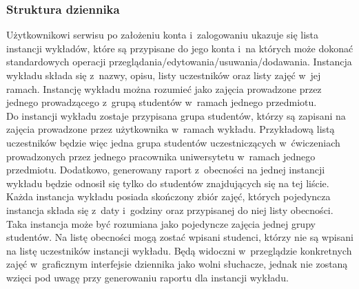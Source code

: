 \documentclass[declaration,shortabstract, mgr]{iithesis}
\begin{document}
\subsubsection{Struktura dziennika}
\indent Użytkownikowi serwisu po założeniu konta i~zalogowaniu ukazuje się lista instancji wykładów, które są przypisane do jego konta i~na których może dokonać standardowych operacji przeglądania/edytowania/usuwania/dodawania. Instancja wykładu składa się z~nazwy, opisu, listy uczestników oraz listy zajęć w~jej ramach. Instancję wykładu można rozumieć jako zajęcia prowadzone przez jednego prowadzącego z~grupą studentów w~ramach jednego przedmiotu. \\
\indent Do instancji wykładu zostaje przypisana grupa studentów, którzy są zapisani na zajęcia prowadzone przez użytkownika w~ramach wykładu. Przykładową listą uczestników będzie więc jedna grupa studentów uczestniczących w~ćwiczeniach prowadzonych przez jednego pracownika uniwersytetu w~ramach jednego przedmiotu. Dodatkowo, generowany raport z~obecności na jednej instancji wykładu będzie odnosił się tylko do studentów znajdujących się na tej liście.\\
\indent Każda instancja wykładu posiada skończony zbiór zajęć, których pojedyncza instancja składa się z~daty i~godziny oraz przypisanej do niej listy obecności. Taka instancja może być rozumiana jako pojedyncze zajęcia jednej grupy studentów. Na listę obecności mogą zostać wpisani studenci, którzy nie są wpisani na listę uczestników instancji wykładu. Będą widoczni w~przeglądzie konkretnych zajęć w~graficznym interfejsie dziennika jako wolni słuchacze, jednak nie zostaną wzięci pod uwagę przy generowaniu raportu dla instancji wykładu.\\
\end{document}
